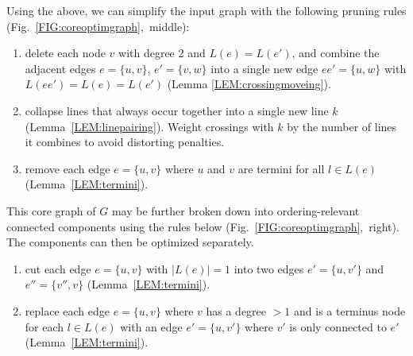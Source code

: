 \documentclass[sigconf]{acmart}
\begin{document}
Using the above, we can simplify the input graph with the following pruning rules (Fig.~\ref{FIG:coreoptimgraph},~middle):
\begin{enumerate}[parsep=0.5mm, wide, labelwidth=0mm, itemindent=2.3mm]
	\setlength\itemsep{1pt}
	\item delete each node $v$ with degree 2 and $L(e) = L(e')$, and combine the adjacent edges $e = \{u, v\}$, $e' = \{v, w\}$ into a single new edge $ee' = \{u, w\}$ with $L(ee') = L(e) = L(e')$ (Lemma \ref{LEM:crossingmoveing}).
	\item collapse lines that always occur together into a single new line $k$ (Lemma~\ref{LEM:linepairing}). Weight crossings with $k$ by the number of lines it combines to avoid distorting penalties.
	\item remove each edge $e = \{u, v\}$ where $u$ and $v$ are termini for all $l \in L(e)$ (Lemma~\ref{LEM:termini}).
\end{enumerate}
\noindent
This core graph of $G$ may be further broken down into ordering-relevant connected components using the rules below (Fig.~\ref{FIG:coreoptimgraph},~right). The components can then be optimized separately.
\begin{enumerate}[parsep=0.5mm, wide, labelwidth=0mm, itemindent=2.3mm]
	\setlength\itemsep{1pt}
    \item cut each edge $e = \{u, v\}$ with $\left|L\left(e\right)\right| = 1$ into two edges $e' = \{u, v'\}$ and $e'' = \{v'', v\}$ (Lemma~\ref{LEM:termini}).
    \item replace each edge $e = \{u, v\}$ where $v$ has a degree $>1$ and is a terminus node for each $l \in L(e)$ with an edge $e' = \{u, v'\}$ where $v'$ is only connected to $e'$ (Lemma~\ref{LEM:termini}).
\end{enumerate}
%
\end{document}
